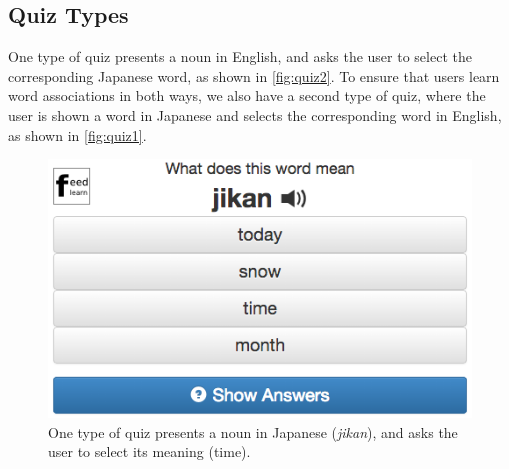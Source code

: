 \documentclass{sigchi}
\begin{document}

\subsection{Quiz Types}

One type of quiz presents a noun in English, and asks the user to select the corresponding Japanese word, as shown in \autoref{fig:quiz2}. To ensure that users learn word associations in both ways, we also have a second type of quiz, where the user is shown a word in Japanese and selects the corresponding word in English, as shown in \autoref{fig:quiz1}.

\begin{figure}
\centering
\includegraphics[width=1.0\columnwidth]{quiz1}
\caption{One type of quiz presents a noun in Japanese (\textit{jikan}), and asks the user to select its meaning (time).}
\label{fig:quiz1}
\end{figure}
\end{document}

